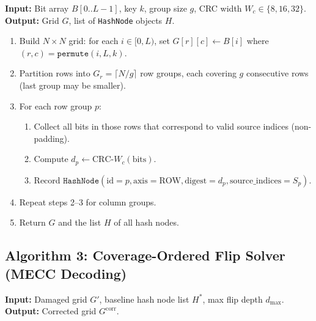 \noindent\textbf{Input:} Bit array $B[0..L{-}1]$, key $k$, group size $g$, CRC width $W_c \in \{8,16,32\}$.\\
\textbf{Output:} Grid $G$, list of \texttt{HashNode} objects $H$.

\begin{enumerate}
    \item Build $N \times N$ grid: for each $i \in [0,L)$, set $G[r][c] \gets B[i]$ where $(r,c) = \texttt{permute}(i, L, k)$.
    \item Partition rows into $G_r = \lceil N/g \rceil$ row groups, each covering $g$ consecutive rows (last group may be smaller).
    \item For each row group $p$:
    \begin{enumerate}
        \item Collect all bits in those rows that correspond to valid source indices (non-padding).
        \item Compute $d_p \gets \text{CRC-}W_c(\text{bits})$.
        \item Record $\texttt{HashNode}(\text{id}=p, \text{axis}=\text{ROW}, \text{digest}=d_p, \text{source\_indices}=S_p)$.
    \end{enumerate}
    \item Repeat steps 2--3 for column groups.
    \item Return $G$ and the list $H$ of all hash nodes.
\end{enumerate}

\bigskip

\subsection*{Algorithm 3: Coverage-Ordered Flip Solver (MECC Decoding)}

\noindent\textbf{Input:} Damaged grid $G'$, baseline hash node list $H^*$, max flip depth $d_{\max}$.\\
\textbf{Output:} Corrected grid $G^{\text{corr}}$.

